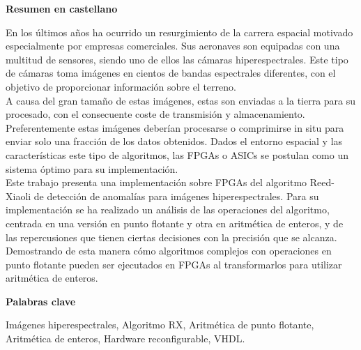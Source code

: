 
\newpage

\thispagestyle{empty}

\begin{center}

{\bf \Huge Resumen en castellano}

  \end{center}
\vspace{1cm}

En los últimos años ha ocurrido un resurgimiento de la carrera espacial motivado especialmente por empresas comerciales. Sus aeronaves son equipadas con una multitud de sensores, siendo uno de ellos las cámaras hiperespectrales. Este tipo de cámaras toma imágenes en cientos de bandas espectrales diferentes, con el objetivo de proporcionar información sobre el terreno.
\\
A causa del gran tamaño de estas imágenes, estas son enviadas a la tierra para su procesado, con el consecuente coste de transmisión y almacenamiento. Preferentemente estas imágenes deberían procesarse o comprimirse in situ para enviar solo una fracción de los datos obtenidos. Dados el entorno espacial y las características este tipo de algoritmos, las FPGAs o ASICs se postulan como un sistema óptimo para su implementación.
\\
Este trabajo presenta una implementación sobre FPGAs del algoritmo Reed-Xiaoli de detección de anomalías para imágenes hiperespectrales. Para su implementación se ha realizado un análisis de las operaciones del algoritmo, centrada en una versión en punto flotante y otra en aritmética de enteros, y de las repercusiones que tienen ciertas decisiones con la precisión que se alcanza.
Demostrando de esta manera cómo algoritmos complejos con operaciones en punto flotante pueden ser ejecutados en FPGAs al transformarlos para utilizar aritmética de enteros.



\vspace{1cm}


\begin{center}

{\bf \Large Palabras clave}

   \end{center}

   \vspace{0.5cm}
   
Imágenes hiperespectrales, Algoritmo RX, Aritmética de punto flotante, Aritmética de enteros, Hardware reconfigurable, VHDL.   


